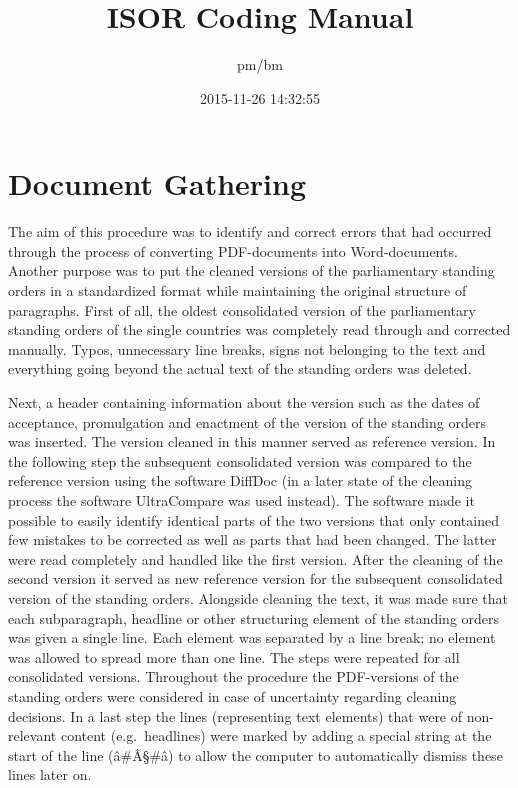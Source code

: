 \documentclass[]{article}
\title{ISOR Coding Manual}
\author{pm/bm}
\date{2015-11-26 14:32:55}
\begin{document}
\maketitle

\section{Document Gathering}\label{document-gathering}

The aim of this procedure was to identify and correct errors that had
occurred through the process of converting PDF-documents into
Word-documents. Another purpose was to put the cleaned versions of the
parliamentary standing orders in a standardized format while maintaining
the original structure of paragraphs. First of all, the oldest
consolidated version of the parliamentary standing orders of the single
countries was completely read through and corrected manually. Typos,
unnecessary line breaks, signs not belonging to the text and everything
going beyond the actual text of the standing orders was deleted.

Next, a header containing information about the version such as the
dates of acceptance, promulgation and enactment of the version of the
standing orders was inserted. The version cleaned in this manner served
as reference version. In the following step the subsequent consolidated
version was compared to the reference version using the software DiffDoc
(in a later state of the cleaning process the software UltraCompare was
used instead). The software made it possible to easily identify
identical parts of the two versions that only contained few mistakes to
be corrected as well as parts that had been changed. The latter were
read completely and handled like the first version. After the cleaning
of the second version it served as new reference version for the
subsequent consolidated version of the standing orders. Alongside
cleaning the text, it was made sure that each subparagraph, headline or
other structuring element of the standing orders was given a single
line. Each element was separated by a line break; no element was allowed
to spread more than one line. The steps were repeated for all
consolidated versions. Throughout the procedure the PDF-versions of the
standing orders were considered in case of uncertainty regarding
cleaning decisions. In a last step the lines (representing text
elements) that were of non-relevant content (e.g.~headlines) were marked
by adding a special string at the start of the line (â\#Â§\#â) to allow
the computer to automatically dismiss these lines later on.
\end{document}
